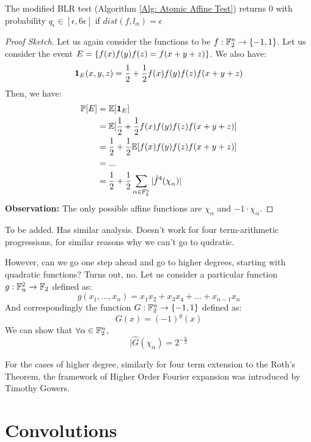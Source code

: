 \begin{theorem}
    The modified BLR test (Algorithm \ref{Alg: Atomic Affine Test}) returns 0 with probability $q_\epsilon \in [\epsilon,6\epsilon]$ if $dist(f,l_\alpha) = \epsilon$

    \begin{proof}[Proof Sketch]
        Let us again consider the functions to be ${f} : {\mathbb{F}_2^n} \rightarrow {\{-1,1\}}$. Let us consider the event $E = \{{f(x)f(y)f(z) = f(x+y+z)}\}$. We also have:
        \[\mathbf{1}_E(x,y,z) = \frac{1}{2} + \frac{1}{2} f(x)f(y)f(z)f(x+y+z) \]
        Then, we have:
        \begin{align*}
            \Pr[E] &= \E[\indicator_E]\\
                    &=\E[\frac{1}{2} + \frac{1}{2} f(x)f(y)f(z)f(x+y+z)]\\
                    &= \frac{1}{2} + \frac{1}{2} \E[f(x)f(y)f(z)f(x+y+z)]\\
                    &= ...\\
                    &= \frac{1}{2} +\frac{1}{2}\sum_{\alpha\in\F_2^n} |\fhat^4(\chi_\alpha)|
        \end{align*}    
        \textbf{Observation: } The only possible affine functions are $\chi_\alpha$ and $-1 \cdot \chi_\alpha$.
    \end{proof}
\end{theorem}

\begin{idea}
    To be added. Has similar analysis. Doesn't work for four term-arithmetic progressions, for similar reasons why we can't go to qudratic.
\end{idea}

However, can we go one step ahead and go to higher degrees, starting with quadratic functions? Turns out, no. Let us consider a particular function ${g} : {\mathbb{F}_n^2} \rightarrow {\mathbb{F}_2}$ defined as:
\[g(x_1,...,x_n) = x_1x_2 + x_3x_4+...+x_{n-1}x_n\]
And correspondingly the function ${G} : {\mathbb{F}_2^n} \rightarrow {\{-1,1\}}$ defined as:
\[G(x) = (-1)^g(x)\]
We can show that $\forall \alpha\in\mathbb{F}_2^n$,
\[|\hat{G}(\chi_\alpha) = 2^{-\frac{n}{2}}\]

\begin{idea}
    For the cases of higher degree, similarly for four term extension to the Roth's Theorem, the framework of Higher Order Fourier expansion was introduced by Timothy Gowers.
\end{idea}

\section{Convolutions}

